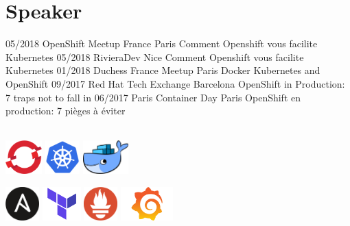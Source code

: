 \documentclass[]{friggeri-cv}
\begin{document}
\section{Speaker}  
\setlength{\parsepsave}{\parsep}%
\setlength{\parsep}{3pt}%
	\begin{entrylist}	
		\entry
		{05/2018}
		{OpenShift Meetup France}
		{Paris}
		{Comment Openshift vous facilite Kubernetes }	
		\entry
		{05/2018}
		{RivieraDev}
		{Nice}
		{Comment Openshift vous facilite Kubernetes }	
		\entry
		{01/2018 }
		{Duchess France Meetup}
		{Paris}
		{Docker Kubernetes and OpenShift}	
		\entry
		{09/2017}
		{Red Hat Tech Exchange}
		{Barcelona}
		{OpenShift in Production: 7 traps not to fall in}	
		\entry
		{06/2017}
		{Paris Container Day}
		{Paris}
		{OpenShift en production: 7 pièges à éviter } 
	\end{entrylist}
\setlength{\parsep}{\parsepsave}%
\\

\qquad \qquad  \includegraphics[height=13mm]{logo/openshift-logo.png}    \qquad \qquad  \includegraphics[height=13mm]{logo/kubernetes-logo.png}  \qquad \qquad 	\includegraphics[height=13mm]{logo/docker-logo.png}  \qquad \qquad 
\vspace{2mm}

\includegraphics[height=13mm]{logo/ansible-logo.png} \qquad \qquad 
\includegraphics[height=13mm]{logo/terraform-logo.png} \qquad \qquad 
\includegraphics[height=13mm]{logo/prometheus-logo.png} \qquad \qquad 
\includegraphics[height=13mm]{logo/grafana-logo.png} \qquad \qquad 
\vspace{2mm}
\end{document}
